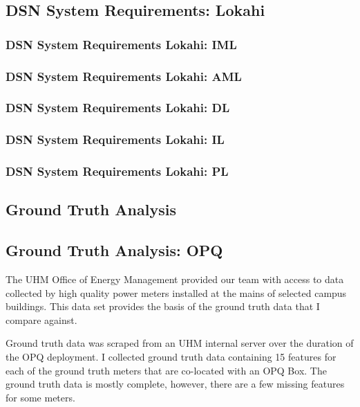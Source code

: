 \subsection{DSN System Requirements: Lokahi}\label{subsec:dsn-system-requirements:-lokahi}

\subsubsection{DSN System Requirements Lokahi: IML}

\subsubsection{DSN System Requirements Lokahi: AML}

\subsubsection{DSN System Requirements Lokahi: DL}

\subsubsection{DSN System Requirements Lokahi: IL}

\subsubsection{DSN System Requirements Lokahi: PL}

\subsection{Ground Truth Analysis}

\subsection{Ground Truth Analysis: OPQ}

The UHM Office of Energy Management provided our team with access to data collected by high quality power meters installed at the mains of selected campus buildings. This data set provides the basis of the ground truth data that I compare against.

Ground truth data was scraped from an UHM internal server over the duration of the OPQ deployment. I collected ground truth data containing 15 features for each of the ground truth meters that are co-located with an OPQ Box. The ground truth data is mostly complete, however, there are a few missing features for some meters.


